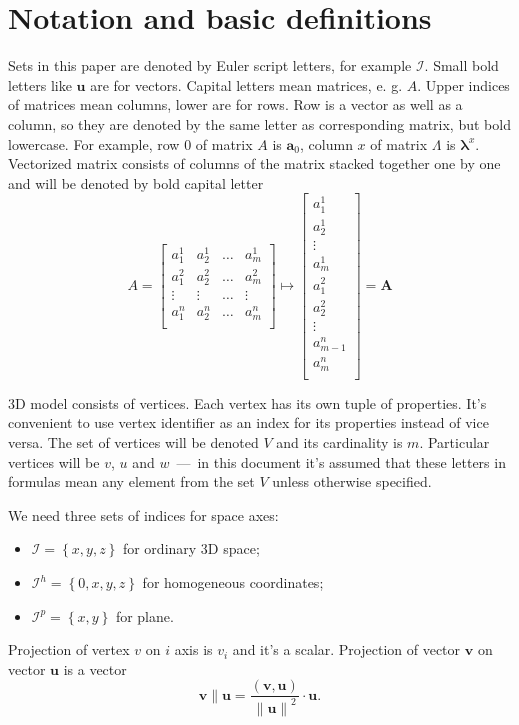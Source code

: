 \section{Notation and basic definitions}

Sets in this paper are denoted by Euler script letters,
for example $\mathcal{I}$.
Small bold letters like $\pmb{u}$ are for vectors.
Capital letters mean matrices, e. g. $A$.
Upper indices of matrices mean columns, lower are for rows.
Row is a vector as well as a column,
so they are denoted by the same letter as corresponding matrix,
but bold lowercase.
For example, row $0$ of matrix $A$ is $\pmb{a}_0$,
column $x$ of matrix $\Lambda$ is $\pmb{\lambda}^x$.
Vectorized matrix consists of columns of the matrix stacked together
one by one and will be denoted by bold capital letter
\begin{equation*}
  A = \begin{bmatrix}
    a^1_1  & a^1_2  & \dots & a^1_m  \\
    a^2_1  & a^2_2  & \dots & a^2_m  \\
    \vdots & \vdots & \dots & \vdots \\
    a^n_1  & a^n_2  & \dots & a^n_m  \\
  \end{bmatrix}
  \mapsto
  \begin{bmatrix}
    a^1_1     \\
    a^1_2     \\
    \vdots    \\
    a^1_m     \\
    a^2_1     \\
    a^2_2     \\
    \vdots    \\
    a^n_{m-1} \\
    a^n_m     \\
  \end{bmatrix}
  = \pmb{A}
\end{equation*}

3D model consists of vertices.
Each vertex has its own tuple of properties.
It's convenient to use vertex identifier as an index for its properties instead of vice versa.
The set of vertices will be denoted $V$ and its cardinality is $m$.
Particular vertices will be $v$, $u$ and $w$~---~in this document
it's assumed that these letters in formulas
mean any element from the set $V$ unless otherwise specified.

We need three sets of indices for space axes:
\begin{itemize}
  \item $\mathcal{I} = \left\{ x, y, z \right\}$ for ordinary 3D space;
  \item $\mathcal{I}^h = \left\{ 0, x, y, z \right\}$ for homogeneous coordinates;
  \item $\mathcal{I}^p = \left\{ x, y \right\}$ for plane.
\end{itemize}

Projection of vertex $v$ on $i$ axis is $v_i$ and it's a scalar.
Projection of vector $\pmb{v}$ on vector $\pmb{u}$ is a vector
\begin{equation*}
  \pmb{v} \parallel \pmb{u}
  = \frac{\left( \pmb{v}, \pmb{u} \right)}{\left\| \pmb{u} \right\|^2}
    \cdot \pmb{u}.
\end{equation*}
